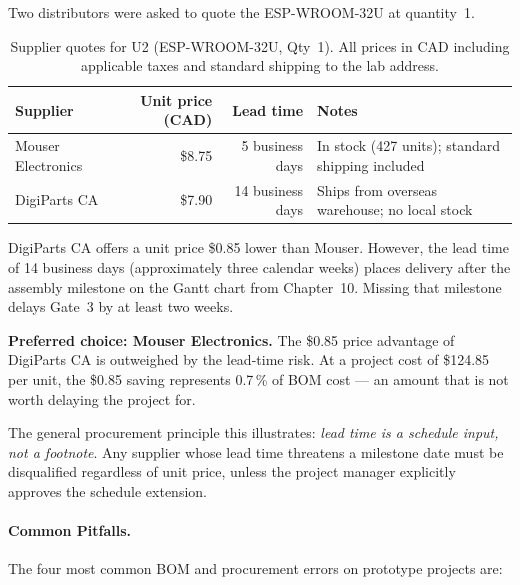 Two distributors were asked to quote the ESP-WROOM-32U at quantity~1.

\begin{table}[htbp]
  \centering
  \caption{Supplier quotes for U2 (ESP-WROOM-32U, Qty~1).
           All prices in CAD including applicable taxes and standard shipping
           to the lab address.}
  \label{tab:ch11-quote}
  \begin{tabular}{lrrp{4.5cm}}
    \toprule
    \textbf{Supplier}   & \textbf{Unit price (CAD)} & \textbf{Lead time} &
    \textbf{Notes} \\
    \midrule
    Mouser Electronics  & \$8.75  & 5 business days  & In stock (427 units); standard shipping included \\
    DigiParts CA        & \$7.90  & 14 business days & Ships from overseas warehouse; no local stock \\
    \bottomrule
  \end{tabular}
\end{table}

DigiParts CA offers a unit price \$0.85 lower than Mouser.
However, the lead time of 14 business days (approximately three calendar weeks)
places delivery after the assembly milestone on the Gantt chart from Chapter~10.
Missing that milestone delays Gate~3 by at least two weeks.

\textbf{Preferred choice: Mouser Electronics.}
The \$0.85 price advantage of DigiParts CA is outweighed by the lead-time risk.
At a project cost of \$124.85 per unit, the \$0.85 saving represents 0.7\,\%
of BOM cost --- an amount that is not worth delaying the project for.

\noindent The general procurement principle this illustrates: \emph{lead time is a schedule input, not a footnote}.
Any supplier whose lead time threatens a milestone date must be disqualified
regardless of unit price, unless the project manager explicitly approves the
schedule extension.

\paragraph{Common Pitfalls.}
The four most common BOM and procurement errors on prototype projects are:

